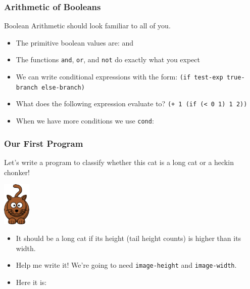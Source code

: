 \documentclass{beamer}
\begin{document}
\begin{frame}
  \frametitle{Arithmetic of Booleans}
  Boolean Arithmetic should look familiar to all of you.
  \begin{itemize}
  \item<2-> The primitive boolean values are: 
     and 
  \item<3-> The functions \texttt{and}, \texttt{or}, and
    \texttt{not} do exactly what you expect
  \item<4-> We can write conditional expressions with the form:
    \texttt{(if test-exp true-branch else-branch)}
  \item<5-> What does the following expression evaluate to?
    \texttt{(+ 1 (if (< 0 1) 1 2))}
  \item<6-> When we have more conditions we use \texttt{cond}:
    \cond
  \end{itemize}  
\end{frame}


\begin{frame}
  \frametitle{Our First Program}
  Let's write a program to classify whether this cat is a long cat or a heckin
  chonker!
  \begin{center}
    \includegraphics[width=0.1\textwidth]{images/cat.png}    
  \end{center}
  \begin{itemize}
  \item<2-> It should be a long cat if its height (tail height counts) is higher
    than its width.
  \item<3-> Help me write it! We're going to need
    \texttt{image-height} and \texttt{image-width}.
  \item<4-> Here it is: \catProgram
  \end{itemize}
\end{frame}
\end{document}
